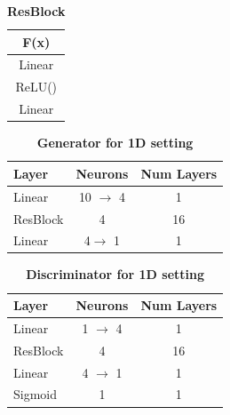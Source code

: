 \begin{table}[h]
\caption{\textbf{ResBlock}} %
\centering %
\begin{tabular}{c} %
\toprule
\textbf{F(x)}\\\midrule
Linear\\ %
ReLU() \\
Linear\\
\bottomrule %
\end{tabular}
\label{table:resblock} %
\end{table}

\begin{table}[h]
\caption{\textbf{Generator for 1D setting}} %
\centering %
\begin{tabular}{l c c}
\toprule
\textbf{Layer} & \textbf{Neurons} & \textbf{Num Layers} \\ \midrule
Linear & 10 $\rightarrow$ 4 & 1  \\ %
ResBlock & 4 & 16 \\ 
Linear & 4$\rightarrow$ 1 & 1 \\ 
\bottomrule %
\end{tabular}
\label{table:1d_G} %
\end{table}

\begin{table}[ht]
\caption{\textbf{Discriminator for 1D setting}} %
\centering %
\begin{tabular}{l c c}
\toprule
\textbf{Layer} & \textbf{Neurons} & \textbf{Num Layers} \\ \midrule
Linear & 1 $\rightarrow$ 4 & 1  \\ %
ResBlock & 4 & 16 \\ 
Linear & 4 $\rightarrow$ 1 & 1 \\
Sigmoid & 1 & 1 \\
\bottomrule %
\end{tabular}
\label{table:1d_D} %
\end{table}

